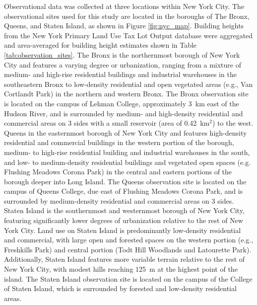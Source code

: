 \documentclass[11pt,a4paper]{article}
\begin{document}
Observational data was collected at three locations within New York City. The observational sites used for this study are located in the boroughs of The Bronx, Queens, and Staten Island, as shown in Figure \ref{fig:nyc_map}. Building heights from the New York  Primary Land Use Tax Lot Output database were aggregated and area-averaged for building height estimates shown in Table \ref{tab:observation_sites}. The Bronx is the northernmost borough of New York City and features a varying degree or urbanization, ranging from a mixture of medium- and high-rise residential buildings and industrial warehouses in the southeastern Bronx to low-density residential and open vegetated areas (e.g., Van Cortlandt Park) in the northern and western Bronx. The Bronx observation site is located on the campus of Lehman College, approximately \SI{3}{\kilo\meter} east of the Hudson River, and is surrounded by medium- and high-density residential and commercial areas on 3 sides with  a small reservoir (area of \SI{0.42}{\kilo\meter}$^2$) to the west. Queens in the easternmost borough of New York City and features high-density residential and commercial buildings in the western portion of the borough, medium- to high-rise residential building and industrial warehouses in the south, and low- to medium-density residential buildings and vegetated open spaces (e.g. Flushing Meadows Corona Park) in the central and eastern portions of the borough deeper into Long Island. The Queens observation site is located on the campus of Queens College, due east of Flushing Meadows Corona Park, and is surrounded by medium-density residential and commercial areas on 3 sides. Staten Island is the southernmost and westernmost borough of New York City, featuring significantly lower degrees of urbanization relative to the rest of New York City. Land use on Staten Island is predominantly low-density residential and commercial, with large open and forested spaces on the western portion (e.g., Freshkills Park) and central portion (Todt Hill Woodlands and Latourette Park). Additionally, Staten Island features more variable terrain relative to the rest of New York City, with modest hills reaching \SI{125}{\meter} at the highest point of the island. The Staten Island observation site is located on the campus of the College of Staten Island, which is surrounded by forested and low-density residential areas.
\end{document}
